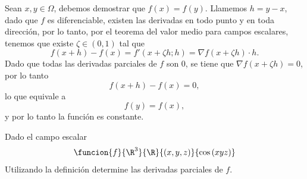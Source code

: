 \documentclass[a4,11pt]{aleph-examen}
\begin{document}
\begin{preguntas}
\begin{respuesta}
\begin{respuesta}
\begin{respuesta}
    Sean $x,y\in \Omega$, debemos demostrar que $f(x)=f(y)$. Llamemos $h=y-x$, dado que $f$ es diferenciable, existen las derivadas en todo punto y en toda dirección, por lo tanto, por el teorema del valor medio para campos escalares, tenemos que existe $\zeta\in(0,1)$ tal que
    \[
        f(x+h)-f(x) = f'(x+\zeta h;h) = \nabla f(x+\zeta h)\cdot h.
    \]
    Dado que todas las derivadas parciales de $f$ son 0, se tiene que $\nabla f(x+\zeta h)=0$, por lo tanto
    \[
        f(x+h)-f(x)=0,
    \]
    lo que equivale a
    \[
        f(y)=f(x),
    \]
    y por lo tanto la función es constante.
\end{respuesta}

\item
    Dado el campo escalar
    \[
        \funcion{f}{\R^3}{\R}{(x,y,z)}{\cos{(xyz)}}
    \]
    Utilizando la definición determine las derivadas parciales de $f$.
    
   

\end{respuesta}
\end{respuesta}
\end{preguntas}
\end{document}
